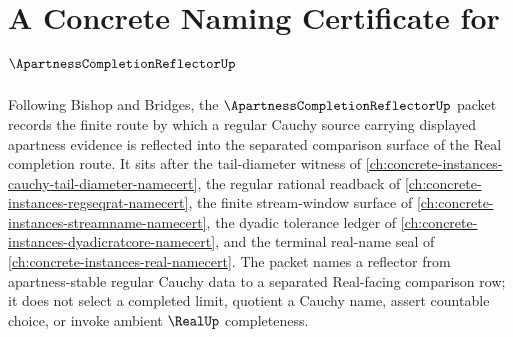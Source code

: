 \chapter{A Concrete Naming Certificate for $\ApartnessCompletionReflectorUp$}
\label{ch:concrete-instances-apartness-completion-reflector-namecert}

Following Bishop and Bridges, the $\ApartnessCompletionReflectorUp$ packet records the finite route by which a regular Cauchy source carrying displayed apartness evidence is reflected into the separated comparison surface of the Real completion route. It sits after the tail-diameter witness of \autoref{ch:concrete-instances-cauchy-tail-diameter-namecert}, the regular rational readback of \autoref{ch:concrete-instances-regseqrat-namecert}, the finite stream-window surface of \autoref{ch:concrete-instances-streamname-namecert}, the dyadic tolerance ledger of \autoref{ch:concrete-instances-dyadicratcore-namecert}, and the terminal real-name seal of \autoref{ch:concrete-instances-real-namecert}. The packet names a reflector from apartness-stable regular Cauchy data to a separated Real-facing comparison row; it does not select a completed limit, quotient a Cauchy name, assert countable choice, or invoke ambient $\RealUp$ completeness.

